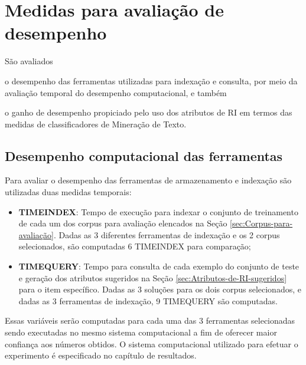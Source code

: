 \section{Medidas para avaliação de desempenho}  \label{sec:Medidas-para-avaliação-de-desempenho}
    São avaliados
    \begin{enumerate*}[label=(\alph*)]
        \item o desempenho das ferramentas utilizadas para indexação e consulta, por meio da avaliação temporal do desempenho computacional, e também
        \item o ganho de desempenho propiciado pelo uso dos atributos de RI em termos das medidas de classificadores de Mineração de Texto. %
    \end{enumerate*} 
    
    \subsection{Desempenho computacional das ferramentas}  \label{subsec:Desempenho-computacional}
        Para avaliar o desempenho das ferramentas de armazenamento e indexação são utilizadas duas medidas temporais:
        \begin{itemize}
            \item \textbf{TIME\underscore{}INDEX}: Tempo de execução para indexar o conjunto de treinamento de cada um dos corpus para avaliação elencados na Seção \ref{sec:Corpus-para-avaliação}. Dadas as 3 diferentes ferramentas de indexação e os 2 corpus selecionados, são computadas 6 TIME\underscore{}INDEX para comparação;
            
            \item \textbf{TIME\underscore{}QUERY}: Tempo para consulta de cada exemplo do conjunto de teste e geração dos atributos sugeridos na Seção \ref{sec:Atributos-de-RI-sugeridos} para o item específico. Dadas as 3 soluções para os dois corpus selecionados, e dadas as 3 ferramentas de indexação, 9 TIME\underscore{}QUERY são computadas.  
        \end{itemize}
        
        Essas variáveis serão computadas para cada uma das 3 ferramentas selecionadas sendo executadas no mesmo sistema computacional a fim de oferecer maior confiança aos números obtidos. 
        O sistema computacional utilizado para efetuar o experimento é especificado no capítulo de resultados.
    

